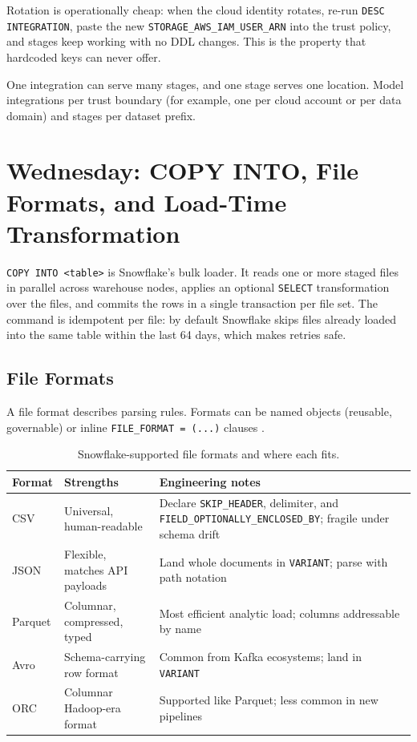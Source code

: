 Rotation is operationally cheap: when the cloud identity rotates, re-run \texttt{DESC INTEGRATION}, paste the new \texttt{STORAGE\_AWS\_IAM\_USER\_ARN} into the trust policy, and stages keep working with no DDL changes. This is the property that hardcoded keys can never offer.

\begin{notebox}
One integration can serve many stages, and one stage serves one location. Model integrations per trust boundary (for example, one per cloud account or per data domain) and stages per dataset prefix.
\end{notebox}

\section{Wednesday: COPY INTO, File Formats, and Load-Time Transformation}
\texttt{COPY INTO <table>} is Snowflake's bulk loader. It reads one or more staged files in parallel across warehouse nodes, applies an optional \texttt{SELECT} transformation over the files, and commits the rows in a single transaction per file set. The command is idempotent per file: by default Snowflake skips files already loaded into the same table within the last 64 days, which makes retries safe.

\subsection{File Formats}
A file format describes parsing rules. Formats can be named objects (reusable, governable) or inline \texttt{FILE\_FORMAT = (...)} clauses \cite{snowflakeFileFormatsDocs}.

\begin{table}[H]
\centering
\small
\begin{tabular}{@{}p{2.2cm}p{4.6cm}p{6.4cm}@{}}
\toprule
\textbf{Format} & \textbf{Strengths} & \textbf{Engineering notes} \\
\midrule
CSV & Universal, human-readable & Declare \texttt{SKIP\_HEADER}, delimiter, and \texttt{FIELD\_OPTIONALLY\_ENCLOSED\_BY}; fragile under schema drift \\
JSON & Flexible, matches API payloads & Land whole documents in \texttt{VARIANT}; parse with path notation \\
Parquet & Columnar, compressed, typed & Most efficient analytic load; columns addressable by name \\
Avro & Schema-carrying row format & Common from Kafka ecosystems; land in \texttt{VARIANT} \\
ORC & Columnar Hadoop-era format & Supported like Parquet; less common in new pipelines \\
\bottomrule
\end{tabular}
\caption{Snowflake-supported file formats and where each fits.}
\label{tab:chapter5-file-formats}
\end{table}

